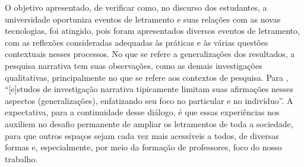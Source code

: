 \documentclass{textolivre}
\begin{document}
O objetivo apresentado, de verificar como, no discurso dos estudantes, a universidade oportuniza eventos de letramento e suas relações com as novas tecnologias, foi atingido, pois foram apresentados diversos eventos de letramento, com as reflexões consideradas adequadas às práticas e às várias questões contextuais nesses processos. No que se refere a generalizações dos resultados, a pesquisa narrativa tem suas observações, como as demais investigações qualitativas, principalmente no que se refere aos contextos de pesquisa. Para \textcite[p. 92]{barkhuizen_narrative_2014}, “[e]studos de investigação narrativa tipicamente limitam suas afirmações nesses aspectos (generalizações), enfatizando seu foco no particular e no indivíduo”. A expectativa, para a continuidade desse diálogo, é que essas experiências nos auxiliem no desafio permanente de ampliar os letramentos de toda a sociedade, para que outros espaços sejam cada vez mais acessíveis a todos, de diversas formas e, especialmente, por meio da formação de professores, foco do nosso trabalho.

\printbibliography\label{sec-bib}
\end{document}
